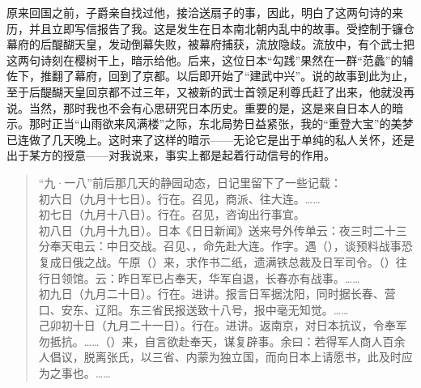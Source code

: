 原来回国之前，子爵亲自找过他，接洽送扇子的事，因此，明白了这两句诗的来历，并且立即写信报告了我。这是发生在日本南北朝内乱中的故事。受控制于镰仓幕府的后醍醐天皇，发动倒幕失败，被幕府捕获，流放隐歧。流放中，有个武士把这两句诗刻在樱树干上，暗示给他。后来，这位日本“勾践”果然在一群“范蠡”的辅佐下，推翻了幕府，回到了京都。以后即开始了“建武中兴”。说的故事到此为止，至于后醍醐天皇回京都不过三年，又被新的武士首领足利尊氏赶了出来，他就没再说。当然，那时我也不会有心思研究日本历史。重要的是，这是来自日本人的暗示。那时正当“山雨欲来风满楼”之际，东北局势日益紧张，我的“重登大宝”的美梦已连做了几天晚上。这时来了这样的暗示——无论它是出于单纯的私人关怀，还是出于某方的授意——对我说来，事实上都是起着行动信号的作用。\\

\begin{quote}
	“九·一八”前后那几天的静园动态，日记里留下了一些记载：\\

初六日（九月十七日）。行在。召见，商派、往大连。……\\

初七日（九月十八日）。行在。召见，咨询出行事宜。\\

初八日（九月十九日）。日本《日日新闻》送来号外传单云：夜三时二十三分奉天电云：中日交战。召见、，命先赴大连。作字。遇（），谈预料战事恐复成日俄之战。午原（）来，求作书二纸，遗满铁总裁及日军司令。（）往行日领馆。云：昨日军已占奉天，华军自退，长春亦有战事。……\\

初九日（九月二十日）。行在。进讲。报言日军据沈阳，同时据长春、营口、安东、辽阳。东三省民报送致十八号，报中毫无知觉。……\\

己卯初十日（九月二十一日）。行在。进讲。返南京，对日本抗议，令奉军勿抵抗。……（）来，自言欲赴奉天，谋复辟事。余曰：若得军人商人百余人倡议，脱离张氏，以三省、内蒙为独立国，而向日本上请愿书，此及时应为之事也。……\\
\end{quote}

